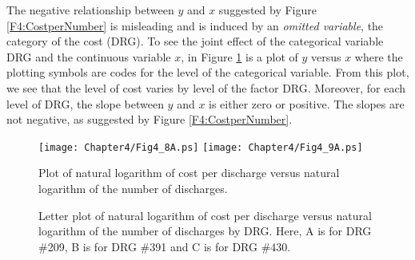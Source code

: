 The negative relationship between $y$ and $x$ suggested by Figure
\ref{F4:CostperNumber} is misleading and is induced by an
\textit{omitted variable}, the category of the cost (DRG). To see
the joint effect of the categorical variable DRG and the continuous
variable $x$, in Figure \ref{F4:DRGbyNumber} is a plot of $y$ versus
$x$ where the plotting symbols are codes for the level of the
categorical variable. From this plot, we see that the level of cost
varies by level of the factor DRG. Moreover, for each level of DRG,
the slope between $y$ and $x$ is either zero or positive. The slopes
are not negative, as suggested by Figure \ref{F4:CostperNumber}.

\begin{figure}[htp]
  \begin{center}
    \texttt{[image: Chapter4/Fig4\_8A.ps]}
    \texttt{[image: Chapter4/Fig4\_9A.ps]} \hfill
    \parbox[t]{2.5in}{\caption{\label{F4:CostperNumber} \small  Plot of natural logarithm of cost per discharge versus natural
logarithm of the number of discharges.}} \hfill
    \parbox[t]{2.5in}{\caption{\label{F4:DRGbyNumber} \small  Letter plot of natural logarithm of cost per discharge versus natural
logarithm of the number of discharges by DRG. Here, A is for DRG
\#209, B is for DRG \#391 and C is for DRG \#430.}}
  \end{center}
\end{figure}


